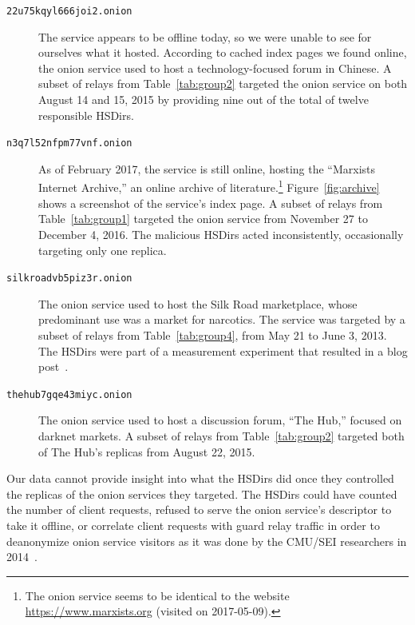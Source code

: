 \begin{description}
	\item[\texttt{22u75kqyl666joi2.onion}] The service appears to be offline
		today, so we were unable to see for ourselves what it hosted.  According
		to cached index pages we found online, the onion service used to host a
		technology-focused forum in Chinese.  A subset of relays from
		Table~\ref{tab:group2} targeted the onion service on both August 14 and
		15, 2015 by providing nine out of the total of twelve responsible
		HSDirs.

	\item[\texttt{n3q7l52nfpm77vnf.onion}] As of February 2017, the service is
		still online, hosting the ``Marxists Internet Archive,'' an online
		archive of literature.\footnote{The onion service seems to be identical
		to the website \url{https://www.marxists.org} (visited on 2017-05-09).}
		Figure~\ref{fig:archive} shows a screenshot of the service's index page.
		A subset of relays from Table~\ref{tab:group1} targeted the onion
		service from November 27 to December 4, 2016.  The malicious HSDirs
		acted inconsistently, occasionally targeting only one replica.

	\item[\texttt{silkroadvb5piz3r.onion}] The onion service used to host the
		Silk Road marketplace, whose predominant use was a market for narcotics.
		The service was targeted by a subset of relays from
		Table~\ref{tab:group4}, from May 21 to June 3, 2013.  The HSDirs were
		part of a measurement experiment that resulted in a blog
		post~\cite{OCearbhaill2013a}.

	\item[\texttt{thehub7gqe43miyc.onion}] The onion service used to host a
		discussion forum, ``The Hub,'' focused on darknet markets.  A subset of
		relays from Table~\ref{tab:group2} targeted both of The Hub's replicas
		from August 22, 2015.
\end{description}

Our data cannot provide insight into what the HSDirs did once they controlled
the replicas of the onion services they targeted.  The HSDirs could have counted
the number of client requests, refused to serve the onion service's descriptor
to take it offline, or correlate client requests with guard relay traffic in
order to deanonymize onion service visitors as it was done by the CMU/SEI
researchers in 2014~\cite{Dingledine2014a}.

